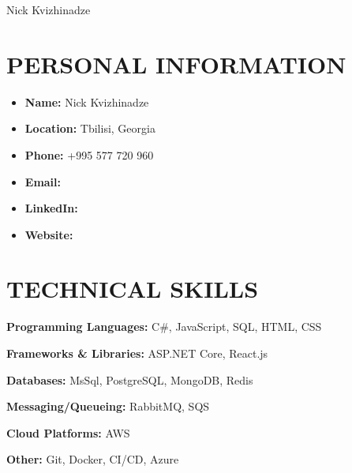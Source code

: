 \documentclass[letterpaper,11pt]{article}
\begin{document}


\begin{center}
    {\huge Nick Kvizhinadze} \\ \vspace{2pt} 
    \vspace{-7pt}
\end{center}

\section{\color{airforceblue}PERSONAL INFORMATION}
\begin{itemize}[leftmargin=0.15in]
  \item[] \textbf{Name:} Nick Kvizhinadze
  \item[] \textbf{Location:} Tbilisi, Georgia
  \item[] \textbf{Phone:} +995 577 720 960
  \item[] \textbf{Email:} \href{mailto:nickkvizhinadze@gmail.com}{\color{blue}{nickkvizhinadze@gmail.com}}
  \item[] \textbf{LinkedIn:} \href{https://www.linkedin.com/in/nickkvizhinadze/}{\color{blue}{linkedin.com/in/nickkvizhinadze}}
  \item[] \textbf{Website:} \href{https://kvizhinadze.net}{\color{blue}{kvizhinadze.net}}
\end{itemize}

\section{\color{airforceblue}TECHNICAL SKILLS}
 \begin{itemize}[leftmargin=0in, label={}]
    \small{\item{
     \textbf{\normalsize{Programming Languages:}}{ \normalsize{C\#, JavaScript, SQL, HTML, CSS}} \\
      \vspace{1.2pt}
      
     \textbf{\normalsize{Frameworks \& Libraries:}}{ \normalsize{ASP.NET Core, React.js}} \\
      \vspace{1.2pt}
      
     \textbf{\normalsize{Databases:}}{ \normalsize{MsSql, PostgreSQL, MongoDB, Redis}} \\
      \vspace{1.2pt}
      
     \textbf{\normalsize{Messaging/Queueing:}}{ \normalsize{RabbitMQ, SQS}} \\
      \vspace{1.2pt}
      
     \textbf{\normalsize{Cloud Platforms:}}{ \normalsize{AWS}} \\
      \vspace{1.2pt}
      
     \textbf{\normalsize{Other:}}{ \normalsize{Git, Docker, CI/CD, Azure }}
     }}
 \end{itemize}
 \vspace{-16pt}
 
\end{document}
